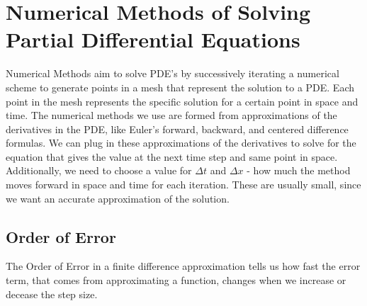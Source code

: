 \documentclass{article}
\def\ds{\displaystyle}
\def\d#1#2{\frac{d#1}{d#2}} %
\newcommand{\red}[1]{\textcolor{red}{#1}}
\newcommand{\blue}[1]{\textcolor{blue}{#1}}
\begin{document}
\section{Numerical Methods of Solving Partial Differential Equations}

Numerical Methods aim to solve PDE's by successively iterating a numerical scheme to generate points in a mesh that represent the solution to a PDE. Each point in the mesh represents the specific solution for a certain point in space and time. The numerical methods we use are formed from approximations of the derivatives in the PDE, like Euler's forward, backward, and centered difference formulas. We can plug in these approximations of the derivatives to solve for the equation that gives the value at the next time step and same point in space. Additionally, we need to choose a value for $\Delta t$ and $\Delta x$ - how much the method moves forward in space and time for each iteration. These are usually small, since we want an accurate approximation of the solution. 


\subsection{Order of Error}

The Order of Error in a finite difference approximation tells us how fast the error term, that comes from approximating a function, changes when we increase or decease the step size.\newline
\end{document}
